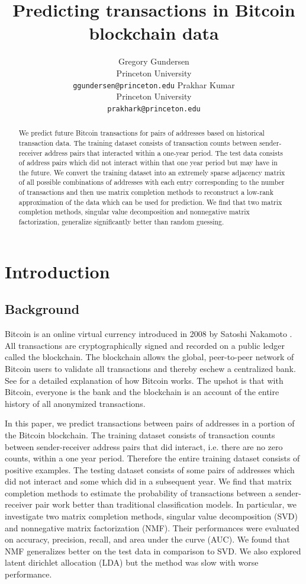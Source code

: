 \documentclass{article} %
\title{Predicting transactions in Bitcoin blockchain data}
\author{
Gregory Gundersen\\
Princeton University\\
\texttt{ggundersen@princeton.edu}
\And
Prakhar Kumar \\
Princeton University \\
\texttt{prakhark@princeton.edu} \\
}
\begin{document}
\maketitle

\begin{abstract}
We predict future Bitcoin transactions for pairs of addresses based on historical transaction data. The training dataset consists of transaction counts between sender-receiver address pairs that interacted within a one-year period. The test data consists of address pairs which did not interact within that one year period but may have in the future. We convert the training dataset into an extremely sparse adjacency matrix of all possible combinations of addresses with each entry corresponding to the number of transactions and then use matrix completion methods to reconstruct a low-rank approximation of the data which can be used for prediction. We find that two matrix completion methods, singular value decomposition and nonnegative matrix factorization, generalize significantly better than random guessing.
\end{abstract}

\section{Introduction}

\subsection{Background}

Bitcoin is an online virtual currency introduced in 2008 by Satoshi Nakamoto \cite{nakamoto2008bitcoin}. All transactions are cryptographically signed and recorded on a public ledger called the blockchain. The blockchain allows the global, peer-to-peer network of Bitcoin users to validate all transactions and thereby eschew a centralized bank. See \cite{nielsen2013bitcoin} for a detailed explanation of how Bitcoin works. The upshot is that with Bitcoin, everyone is the bank and the blockchain is an account of the entire history of all anonymized transactions.

In this paper, we predict transactions between pairs of addresses in a portion of the Bitcoin blockchain. The training dataset consists of transaction counts between sender-receiver address pairs that did interact, i.e. there are no zero counts, within a one year period. Therefore the entire training dataset consists of positive examples. The testing dataset consists of some pairs of addresses which did not interact and some which did in a subsequent year. We find that matrix completion methods to estimate the probability of transactions between a sender-receiver pair work better than traditional classification models. In particular, we investigate two matrix completion methods, singular value decomposition (SVD) and nonnegative matrix factorization (NMF). Their performances were evaluated on accuracy, precision, recall, and area under the curve (AUC). We found that NMF generalizes better on the test data in comparison to SVD. We also explored latent dirichlet allocation (LDA) but the method was slow with worse performance.
\end{document}
